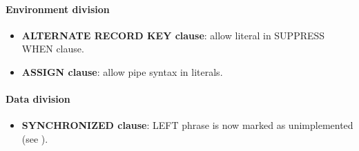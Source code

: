 \paragraph{Environment division}
\begin{itemize}
\item \textbf{ALTERNATE RECORD KEY clause}: allow literal in SUPPRESS WHEN clause.
\item \textbf{ASSIGN clause}: allow pipe syntax in literals.
\end{itemize}

\paragraph{Data division}
\begin{itemize}
\item \textbf{SYNCHRONIZED clause}: LEFT phrase is now marked as unimplemented (see ).
\end{itemize}

